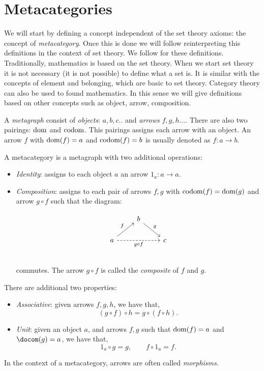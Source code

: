 \section{Metacategories}
We will start by defining a concept independent of the set theory axioms: the concept of \emph{metacategory}. Once this is done we will follow reinterpreting this definitions in the context of set theory. We follow  \cite{mac2013categories} for these definitions.\\


Traditionally, mathematics is based on the set theory. When we start set theory it is not necessary (it is not possible) to define what a set is. It is similar with the concepts of element and belonging, which are basic to set theory. Category theory can also be used to found mathematics. In this sense we will give definitions based on other concepts such as object, arrow, composition. \\

\begin{definition}
  A \emph{metagraph} consist of \emph{objects}: $a,b,c..$ and \emph{arrows} $f,g,h...$. There are also two pairings: $\operatorname{dom}$ and $\operatorname{codom}$. This pairings assigns each arrow with an object. An arrow $f$ with $\operatorname{dom}(f)=a$ and $\operatorname{codom}(f)=b$ is usually denoted as $f:a\to b$.\\
\end{definition}

\begin{definition}
  A metacategory  is a metagraph with two additional operations:
  \begin{itemize}
  \item \emph{Identity}: assigns to each object $a$ an arrow $1_a:a\to a$. 
  \item \emph{Composition}: assigns to each pair of arrows $f,g$ with $\operatorname{codom}(f)=\operatorname{dom}(g)$ and arrow $g\circ f$ such that the diagram:

    \[
      \begin{tikzcd}
        & b \arrow[rd, "g"]& \\
        a\arrow[ru, "f"] \arrow[rr, "g\circ f",swap, dashed] && c\\
      \end{tikzcd}
    \]

    commutes. The arrow $g\circ f$ is called the \emph{composite} of $f$  and $g$.
  \end{itemize}

  There are additional two properties:
  \begin{itemize}
  \item \emph{Associative}: given arrows $f,g,h$, we have that,
    $$(g\circ f) \circ h = g \circ (f \circ h).$$
  \item \emph{Unit}: given an object $a$, and arrows $f,g$ such that $\operatorname{dom} (f)= a$ and $\docom (g) = a$, we have that,
    $$1_a \circ g = g, \qquad f \circ 1_a = f.$$
  \end{itemize}
  In the context of a metacategory, arrows are often called \emph{morphisms}.
\end{definition}

